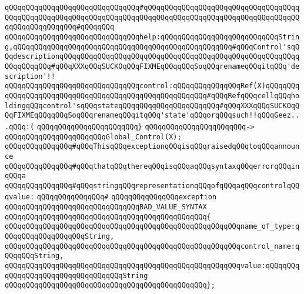 \verb|qQQqqQQqqQQqqQQqqQQqqQQqqQQqqQQq#qQQqqQQqqQQqqQQqqQQqqQQqqQQqqQQqqQQqqQQqqQQqqQQqqQQqqQQqqQQqqQQqqQQqqQQqqQQqqQQqqQQqqQQqqQQqqQQqqQQqqQQqqQQqqQQqqQQqqQQqqQQq#qQQqqQQq|\newline
\verb|qQQqqQQqqQQqqQQqqQQqqQQqqQQqqQQqhelp:qQQqqQQqqQQqqQQqqQQqqQQqqQQqString,qQQqqQQqqQQqqQQqqQQqqQQqqQQqqQQqqQQqqQQqqQQqqQQqqQQq#qQQqControl'sqQQqdescriptionqQQqqQQqqQQqqQQqqQQqqQQqqQQqqQQqqQQqqQQqqQQqqQQqqQQqqQQqqQQqqQQqqQQq#qQQqXXXqQQqSUCKOqQQqFIXMEqQQqqQQqSoqQQqrenameqQQqitqQQq'description'!!|\newline
\verb|qQQqqQQqqQQqqQQqqQQqqQQqqQQqqQQqcontrol:qQQqqQQqqQQqqQQqRef(X)qQQqqQQqqQQqqQQqqQQqqQQqqQQqqQQqqQQqqQQqqQQqqQQqqQQqqQQq#qQQqRefqQQqcellqQQqholdingqQQqcontrol'sqQQqstateqQQqqQQqqQQqqQQqqQQqqQQq#qQQqXXXqQQqSUCKOqQQqFIXMEqQQqqQQqSoqQQqrenameqQQqitqQQq'state'qQQqorqQQqsuch!!qQQqGeez...qQQq:(|\newline
\verb|qQQqqQQqqQQqqQQqqQQqqQQq}|\newline
\verb|qQQqqQQqqQQqqQQqqQQqqQQq->|\newline
\verb|qQQqqQQqqQQqqQQqqQQqqQQqGlobal_Control(X);|\newline
\newline
\newline
\newline
\verb|qQQqqQQqqQQqqQQq#qQQqThisqQQqexceptionqQQqisqQQqraisedqQQqtoqQQqannounce|\newline
\verb|qQQqqQQqqQQqqQQq#qQQqthatqQQqthereqQQqisqQQqaqQQqsyntaxqQQqerrorqQQqinqQQqa|\newline
\verb|qQQqqQQqqQQqqQQq#qQQqstringqQQqrepresentationqQQqofqQQqaqQQqcontrolqQQqvalue:|\newline
\verb|qQQqqQQqqQQqqQQq#|\newline
\verb|qQQqqQQqqQQqqQQqexception|\newline
\verb|qQQqqQQqqQQqqQQqqQQqqQQqqQQqqQQqBAD_VALUE_SYNTAX|\newline
\verb|qQQqqQQqqQQqqQQqqQQqqQQqqQQqqQQqqQQqqQQqqQQqqQQq{|\newline
\verb|qQQqqQQqqQQqqQQqqQQqqQQqqQQqqQQqqQQqqQQqqQQqqQQqqQQqqQQqname_of_type:qQQqqQQqqQQqqQQqqQQqString,|\newline
\verb|qQQqqQQqqQQqqQQqqQQqqQQqqQQqqQQqqQQqqQQqqQQqqQQqqQQqqQQqcontrol_name:qQQqqQQqString,|\newline
\verb|qQQqqQQqqQQqqQQqqQQqqQQqqQQqqQQqqQQqqQQqqQQqqQQqqQQqqQQqvalue:qQQqqQQqqQQqqQQqqQQqqQQqqQQqqQQqqQQqString|\newline
\verb|qQQqqQQqqQQqqQQqqQQqqQQqqQQqqQQqqQQqqQQqqQQqqQQq};|\newline
